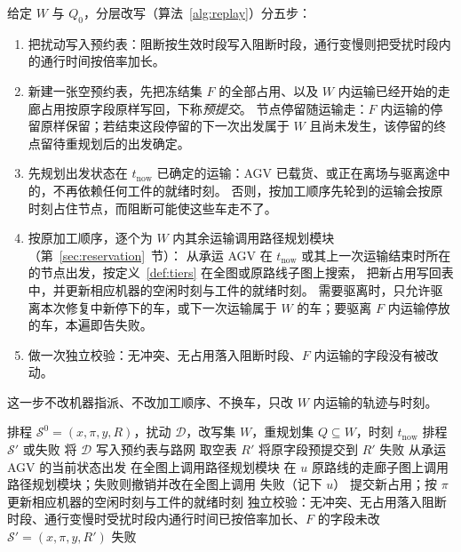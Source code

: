 \documentclass[manuscript,screen,review]{acmart}
\begin{document}
给定 \(W\) 与 \(Q_0\)，分层改写（算法~\ref{alg:replay}）分五步：
\begin{enumerate}[label=(\arabic*),leftmargin=2em,itemsep=0.15em]
\item 把扰动写入预约表：阻断按生效时段写入阻断时段，通行变慢则把受扰时段内的通行时间按倍率加长。
\item 新建一张空预约表，先把冻结集 \(F\) 的全部占用、以及 \(W\) 内运输已经开始的走廊占用按原字段原样写回，下称\emph{预提交}。
节点停留随运输走：\(F\) 内运输的停留原样保留；若结束这段停留的下一次出发属于 \(W\) 且尚未发生，该停留的终点留待重规划后的出发确定。
\item 先规划出发状态在 \(t_{\mathrm{now}}\) 已确定的运输：AGV 已载货、或正在离场与驱离途中的，不再依赖任何工件的就绪时刻。
否则，按加工顺序先轮到的运输会按原时刻占住节点，而阻断可能使这些车走不了。
\item 按原加工顺序，逐个为 \(W\) 内其余运输调用路径规划模块（第~\ref{sec:reservation}~节）：
从承运 AGV 在 \(t_{\mathrm{now}}\) 或其上一次运输结束时所在的节点出发，按定义~\ref{def:tiers} 在全图或原路线子图上搜索，
把新占用写回表中，并更新相应机器的空闲时刻与工件的就绪时刻。
需要驱离时，只允许驱离本次修复中新停下的车，或下一次运输属于 \(W\) 的车；要驱离 \(F\) 内运输停放的车，本遍即告失败。
\item 做一次独立校验：无冲突、无占用落入阻断时段、\(F\) 内运输的字段没有被改动。
\end{enumerate}
这一步不改机器指派、不改加工顺序、不换车，只改 \(W\) 内运输的轨迹与时刻。

\begin{algorithm}[t]
\caption{分层改写 \(\textsc{LayeredReplay}\)}
\label{alg:replay}
\begin{algorithmic}[1]
\Require 排程 \(\mathcal{S}^0=(x,\pi,y,R)\)，扰动 \(\mathcal{D}\)，改写集 \(W\)，重规划集 \(Q\subseteq W\)，时刻 \(t_{\mathrm{now}}\)
\Ensure 排程 \(\mathcal{S}'\) 或失败
\State 将 \(\mathcal{D}\) 写入预约表与路网
\State 取空表 \(R'\)
  \State 将原字段预提交到 \(R'\)
    \State \Return 失败
  \EndIf
\EndFor
{}
  \State 从承运 AGV 的当前状态出发
    \State 在全图上调用路径规划模块
  \Else
    \State 在 \(u\) 原路线的走廊子图上调用路径规划模块；失败则撤销并改在全图上调用 
  \EndIf
    \State \Return 失败（记下 \(u\)）
  \EndIf
  \State 提交新占用；按 \(\pi\) 更新相应机器的空闲时刻与工件的就绪时刻
\EndFor
\State 独立校验：无冲突、无占用落入阻断时段、通行变慢时受扰时段内通行时间已按倍率加长、\(F\) 的字段未改
  \State \Return \(\mathcal{S}'=(x,\pi,y,R')\)
\Else
  \State \Return 失败
\EndIf
\end{algorithmic}
\end{algorithm}
\end{document}

